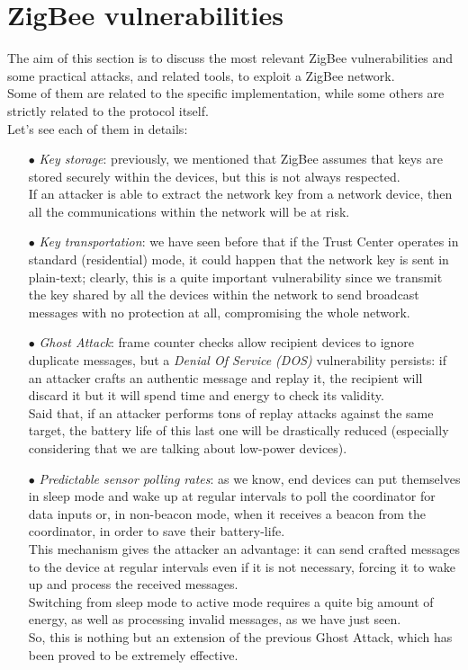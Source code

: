 \documentclass[12pt]{report}
\begin{document}
\clearpage
\section{ZigBee vulnerabilities}
\bigskip
The aim of this section is to discuss the most relevant ZigBee vulnerabilities and some practical attacks, and related tools, to exploit a ZigBee network.\\
Some of them are related to the specific implementation, while some others are strictly related to the protocol itself.\\
Let's see each of them in details:

\begin{itemize}
\setlength{\itemindent}{+4mm}
\item[$\bullet$] \emph{Key storage}: previously, we mentioned that ZigBee assumes that keys are stored securely within the devices, but this is not always respected.\\
If an attacker is able to extract the network key from a network device, then all the communications within the network will be at risk.

\item[$\bullet$] \emph{Key transportation}: we have seen before that if the Trust Center operates in standard (residential) mode, it could happen that the network key is sent in plain-text; clearly, this is a quite important vulnerability since we transmit the key shared by all the devices within the network to send broadcast messages with no protection at all, compromising the whole network.

\item[$\bullet$] \emph{Ghost Attack}: frame counter checks allow recipient devices to ignore duplicate messages, but a \emph{Denial Of Service (DOS)} vulnerability persists: if an attacker crafts an authentic message and replay it, the recipient will discard it but it will spend time and energy to check its validity.\\
Said that, if an attacker performs tons of replay attacks against the same target, the battery life of this last one will be drastically reduced (especially considering that we are talking about low-power devices).

\item[$\bullet$] \emph{Predictable sensor polling rates}: as we know, end devices can put themselves in sleep mode and wake up at regular intervals to poll the coordinator for data inputs or, in non-beacon mode, when it receives a beacon from the coordinator, in order to save their battery-life.\\
This mechanism gives the attacker an advantage: it can send crafted messages to the device at regular intervals even if it is not necessary, forcing it to wake up and process the received messages.\\
Switching from sleep mode to active mode requires a quite big amount of energy, as well as processing invalid messages, as we have just seen.\\
So, this is nothing but an extension of the previous Ghost Attack, which has been proved to be extremely effective.


\end{itemize}
\end{document}
